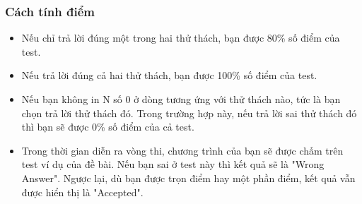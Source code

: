 \subsubsection{   Cách tính điểm  }
\begin{itemize}
	\item     Nếu chỉ trả lời đúng một trong hai thử thách, bạn được 80\% số điểm của test.   
	\item     Nếu trả lời đúng cả hai thử thách, bạn được 100\% số điểm của test.   
	\item     Nếu bạn không in N số 0 ở dòng tương ứng với thử thách nào, tức là bạn chọn trả lời thử thách đó. Trong trường hợp này, nếu trả lời sai thử thách đó thì bạn sẽ được 0\% số điểm của cả test.   
	\item     Trong thời gian diễn ra vòng thi, chương trình của bạn sẽ được chấm trên test ví dụ của đề bài. Nếu bạn sai ở test này thì kết quả sẽ là "Wrong Answer". Ngược lại, dù bạn được trọn điểm hay một phần điểm, kết quả vẫn được hiển thị là "Accepted".   
\end{itemize}
